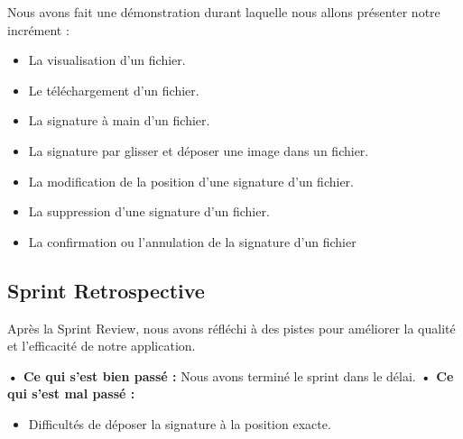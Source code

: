 Nous avons fait une démonstration durant laquelle nous allons présenter notre incrément :
\begin{itemize}
  \item La visualisation d'un fichier.
  \item Le téléchargement d'un fichier.
  \item La signature à main d'un fichier.
  \item La signature par glisser et déposer une image dans un fichier.
  \item La modification de la position d'une signature d'un fichier.
  \item La suppression d'une signature d'un fichier.
  \item La confirmation ou l'annulation de la signature d'un fichier
\end{itemize}

\subsection{Sprint Retrospective}

Après la Sprint Review, nous avons réfléchi à des pistes pour améliorer la qualité et l'efficacité de notre application.


\noindent\textbf{•	Ce qui s'est bien passé :}
Nous avons terminé le sprint dans le délai.
\noindent\textbf{•	Ce qui s'est mal passé :}
\begin{itemize}
  \item Difficultés de déposer la signature à la position exacte.
\end{itemize}

